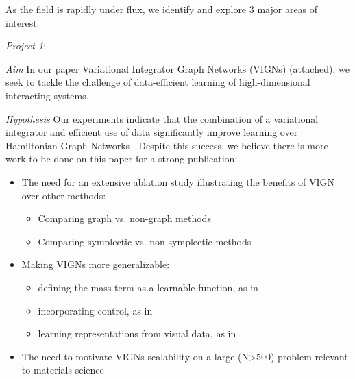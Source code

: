 \documentclass{article}
\begin{document}
As the field is rapidly under flux, we identify and explore 3 major areas of interest.


\textit{Project 1}: 

\textit{Aim} In our paper Variational Integrator Graph Networks (VIGNs) (attached), we seek to tackle the challenge of data-efficient learning of high-dimensional interacting systems. 

\textit{Hypothesis} Our experiments indicate that the combination of a variational integrator and efficient use of data significantly improve learning over Hamiltonian Graph Networks \cite{sanchez-gonzalez_hamiltonian_2019}. Despite this success, we believe there is more work to be done on this paper for a strong publication:

\begin{itemize}
\item{The need for an extensive ablation study illustrating the benefits of VIGN over other methods:}
\begin{itemize}
\item{Comparing graph vs. non-graph methods}
\item{Comparing symplectic vs. non-symplectic methods}
\end{itemize}
\item{Making VIGNs more generalizable}:
\begin{itemize}
\item{defining the mass term as a learnable function, as in \cite{lutter_deep_2019}}
\item{incorporating control, as in \cite{zhong_symplectic_2019}}
\item{learning representations from visual data, as in \cite{greydanus_hamiltonian_2019}}
\end{itemize}
\item{The need to motivate VIGNs scalability on a large (N>500) problem relevant to materials science}
\end{itemize}
\end{document}
